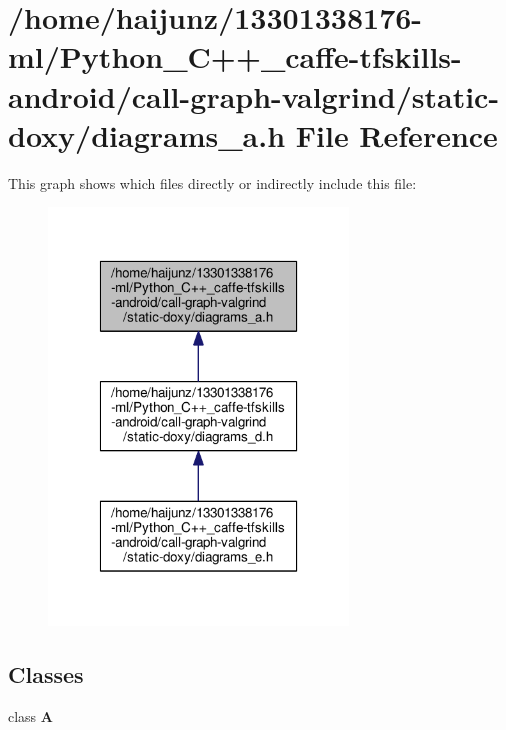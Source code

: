 \section{/home/haijunz/13301338176-\/ml/\-Python\-\_\-\-C++\-\_\-caffe-\/tfskills-\/android/call-\/graph-\/valgrind/static-\/doxy/diagrams\-\_\-a.h File Reference}
\label{diagrams__a_8h}
This graph shows which files directly or indirectly include this file\-:\nopagebreak
\begin{figure}[H]
\begin{center}
\leavevmode
\includegraphics[width=226pt]{diagrams__a_8h__dep__incl}
\end{center}
\end{figure}
\subsection*{Classes}
\begin{DoxyCompactItemize}
\item 
class {\bf A}
\end{DoxyCompactItemize}
